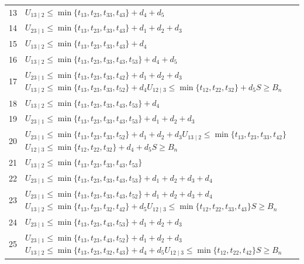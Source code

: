 \documentclass[a4paper,11pt]{amsart}
\numberwithin{equation}{section}
\theoremstyle{definition}
\theoremstyle{remark}
\begin{document}
{\begin{longtable}{@{}r>{\raggedright\arraybackslash}p{12.9cm}@{}}
13 & \(U_{13\mid 2}\leq \min\{t_{13},t_{23},t_{33},t_{43}\}+d_{4}+d_{5}\)\\[3pt]
14 & \(U_{23\mid 1}\leq \min\{t_{13},t_{23},t_{33},t_{43}\}+d_{1}+d_{2}+d_{3}\)\\[3pt]
15 & \(U_{13\mid 2}\leq \min\{t_{13},t_{23},t_{33},t_{43}\}+d_{4}\)\\[3pt]
16 & \(U_{13\mid 2}\leq \min\{t_{13},t_{23},t_{33},t_{43},t_{53}\}+d_{4}+d_{5}\)\\[3pt]
17 & \(U_{23\mid 1}\leq \min\{t_{13},t_{23},t_{33},t_{42}\}+d_{1}+d_{2}+d_{3}\)\newline \(U_{13\mid 2}\leq \min\{t_{13},t_{23},t_{33},t_{52}\}+d_{4}\)\newline \(U_{12\mid 3}\leq \min\{t_{12},t_{22},t_{32}\}+d_{5}\)\newline \(S\geq B_n\)\\[3pt]
18 & \(U_{13\mid 2}\leq \min\{t_{13},t_{23},t_{33},t_{43},t_{53}\}+d_{4}\)\\[3pt]
19 & \(U_{23\mid 1}\leq \min\{t_{13},t_{23},t_{33},t_{43},t_{53}\}+d_{1}+d_{2}+d_{3}\)\\[3pt]
20 & \(U_{23\mid 1}\leq \min\{t_{13},t_{23},t_{33},t_{52}\}+d_{1}+d_{2}+d_{3}\)\newline \(U_{13\mid 2}\leq \min\{t_{13},t_{23},t_{33},t_{42}\}\)\newline \(U_{12\mid 3}\leq \min\{t_{12},t_{22},t_{32}\}+d_{4}+d_{5}\)\newline \(S\geq B_n\)\\[3pt]
21 & \(U_{13\mid 2}\leq \min\{t_{13},t_{23},t_{33},t_{43},t_{53}\}\)\\[3pt]
22 & \(U_{23\mid 1}\leq \min\{t_{13},t_{23},t_{33},t_{43},t_{53}\}+d_{1}+d_{2}+d_{3}+d_{4}\)\\[3pt]
23 & \(U_{23\mid 1}\leq \min\{t_{13},t_{23},t_{33},t_{43},t_{52}\}+d_{1}+d_{2}+d_{3}+d_{4}\)\newline \(U_{13\mid 2}\leq \min\{t_{13},t_{23},t_{32},t_{42}\}+d_{5}\)\newline \(U_{12\mid 3}\leq \min\{t_{12},t_{22},t_{33},t_{43}\}\)\newline \(S\geq B_n\)\\[3pt]
24 & \(U_{23\mid 1}\leq \min\{t_{13},t_{23},t_{43},t_{53}\}+d_{1}+d_{2}+d_{3}\)\\[3pt]
25 & \(U_{23\mid 1}\leq \min\{t_{13},t_{23},t_{43},t_{52}\}+d_{1}+d_{2}+d_{3}\)\newline \(U_{13\mid 2}\leq \min\{t_{13},t_{23},t_{32},t_{43}\}+d_{4}+d_{5}\)\newline \(U_{12\mid 3}\leq \min\{t_{12},t_{22},t_{42}\}\)\newline \(S\geq B_n\)\\[3pt]

\end{longtable}}
\end{document}
